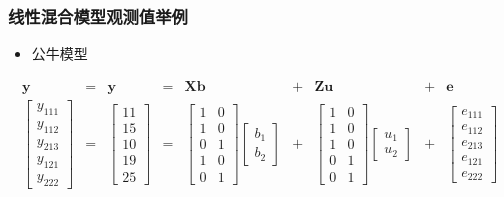 \documentclass[serif,aspectratio=169]{beamer}
\begin{document}
\begin{frame}
  \frametitle{线性混合模型观测值举例}
  \begin{itemize}
  \item 公牛模型
  \end{itemize}
  $$
  \begin{array}{ccccccccc}
    \mathbf{y} & = & \mathbf{y} & = & \mathbf{Xb} & + & \mathbf{Zu} & + & \mathbf{e}\\
    \left[\begin{array}{c}
        y_{111}\\
        y_{112}\\
        y_{213}\\
        y_{121}\\
        y_{222}
      \end{array}\right] & = &
    \left[\begin{array}{c}
        11\\
        15\\
        10\\
        19\\
        25
      \end{array}\right] & = &
    \left[\begin{array}{cc}
        1 & 0\\
        1 & 0\\
        0 & 1\\
        1 & 0\\
        0 & 1
      \end{array}\right]
    \left[\begin{array}{c}b_1\\b_2\end{array}\right] & + &
    \left[\begin{array}{cc}
        1 & 0\\
        1 & 0\\
        1 & 0\\
        0 & 1\\
        0 & 1
      \end{array}\right]
    \left[\begin{array}{c}u_1\\u_2\end{array}\right] & + &
    \left[\begin{array}{c}
        e_{111}\\
        e_{112}\\
        e_{213}\\
        e_{121}\\
        e_{222}
      \end{array}\right]
  \end{array}
  $$
\end{frame}
\end{document}
